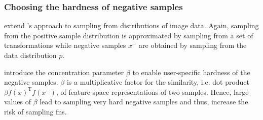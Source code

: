 \subsubsection{Choosing the hardness of negative samples}\label{subsec:choose_hardness}

\citet{robinson_contrastive_2021} 
extend \citet{chuang_debiased_2020}'s approach to sampling from distributions of image data.
Again, sampling from the positive sample distribution is approximated by sampling from a set of transformations
while negative samples $x^-$ are obtained by sampling from the data distribution $p$.

\citet{robinson_contrastive_2021} introduce the concentration parameter $\beta$ 
to enable user-specific hardness of the negative samples.
$\beta$ is a multiplicative factor for the similarity, i.e. dot product $\beta f(x)^\text{T}f(x^-)$, 
of feature space representations of two samples.
Hence, large values of $\beta$ lead to sampling very hard negative samples and thus, 
increase the risk of sampling \acp{fn}.